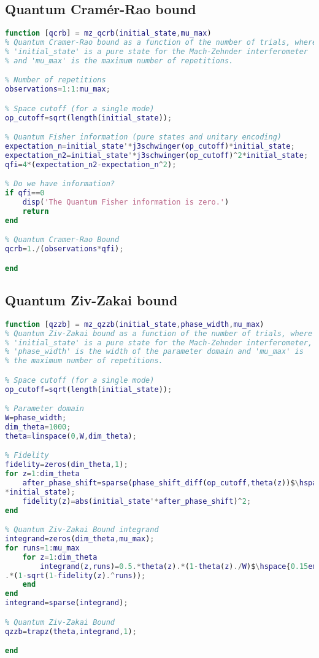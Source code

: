 \subsection{Quantum Cram\'{e}r-Rao bound}
\label{subsec:qcrbmatlab}

\begin{lstlisting}[language=Matlab]
function [qcrb] = mz_qcrb(initial_state,mu_max)
% Quantum Cramer-Rao bound as a function of the number of trials, where
% 'initial_state' is a pure state for the Mach-Zehnder interferometer
% and 'mu_max' is the maximum number of repetitions.

% Number of repetitions
observations=1:1:mu_max;

% Space cutoff (for a single mode)
op_cutoff=sqrt(length(initial_state));

% Quantum Fisher information (pure states and unitary encoding)
expectation_n=initial_state'*j3schwinger(op_cutoff)*initial_state;
expectation_n2=initial_state'*j3schwinger(op_cutoff)^2*initial_state;
qfi=4*(expectation_n2-expectation_n^2);

% Do we have information?
if qfi==0
    disp('The Quantum Fisher information is zero.')
    return
end

% Quantum Cramer-Rao Bound
qcrb=1./(observations*qfi);

end
\end{lstlisting}

\subsection{Quantum Ziv-Zakai bound}
\label{subsec:qzzbnum}

\begin{lstlisting}[language=Matlab, mathescape=true]
function [qzzb] = mz_qzzb(initial_state,phase_width,mu_max)
% Quantum Ziv-Zakai bound as a function of the number of trials, where
% 'initial_state' is a pure state for the Mach-Zehnder interferometer,
% 'phase_width' is the width of the parameter domain and 'mu_max' is 
% the maximum number of repetitions. 

% Space cutoff (for a single mode)
op_cutoff=sqrt(length(initial_state));

% Parameter domain
W=phase_width;
dim_theta=1000;
theta=linspace(0,W,dim_theta);

% Fidelity
fidelity=zeros(dim_theta,1);
for z=1:dim_theta
    after_phase_shift=sparse(phase_shift_diff(op_cutoff,theta(z))$\hspace{0.15em}\swarrow$
*initial_state);
    fidelity(z)=abs(initial_state'*after_phase_shift)^2;
end

% Quantum Ziv-Zakai Bound integrand
integrand=zeros(dim_theta,mu_max);
for runs=1:mu_max
    for z=1:dim_theta
        integrand(z,runs)=0.5.*theta(z).*(1-theta(z)./W)$\hspace{0.15em}\swarrow$
.*(1-sqrt(1-fidelity(z).^runs));    
    end
end
integrand=sparse(integrand);

% Quantum Ziv-Zakai Bound
qzzb=trapz(theta,integrand,1);

end
\end{lstlisting}

